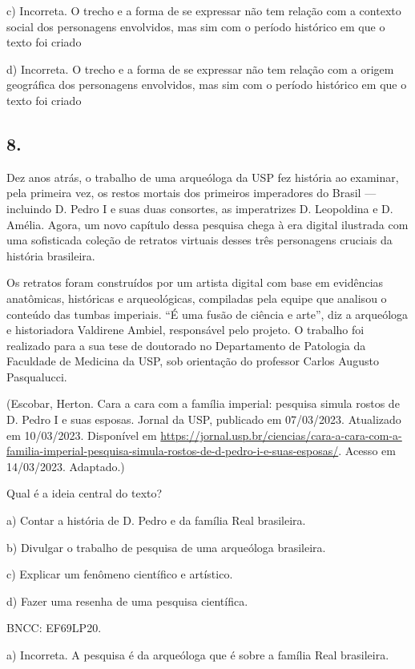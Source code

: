 c) Incorreta. O trecho e a forma de se expressar não tem relação com a
contexto social dos personagens envolvidos, mas sim com o período
histórico em que o texto foi criado

d) Incorreta. O trecho e a forma de se expressar não tem relação com a
origem geográfica dos personagens envolvidos, mas sim com o período
histórico em que o texto foi criado

\hypertarget{section-1}{%
\subsection{8.}\label{section-1}}

Dez anos atrás, o trabalho de uma arqueóloga da USP fez história ao
examinar, pela primeira vez, os restos mortais dos primeiros imperadores
do Brasil --- incluindo D. Pedro I e suas duas consortes, as
imperatrizes D. Leopoldina e D. Amélia. Agora, um novo capítulo dessa
pesquisa chega à era digital ilustrada com uma sofisticada coleção de
retratos virtuais desses três personagens cruciais da história
brasileira.

Os retratos foram construídos por um artista digital com base em
evidências anatômicas, históricas e arqueológicas, compiladas pela
equipe que analisou o conteúdo das tumbas imperiais. ``É uma fusão de
ciência e arte'', diz a arqueóloga e historiadora Valdirene Ambiel,
responsável pelo projeto. O trabalho foi realizado para a sua tese de
doutorado no Departamento de Patologia da Faculdade de Medicina da USP,
sob orientação do professor Carlos Augusto Pasqualucci.

(Escobar, Herton. Cara a cara com a família imperial: pesquisa simula
rostos de D. Pedro I e suas esposas. Jornal da USP, publicado em
07/03/2023. Atualizado em 10/03/2023. Disponível em
\url{https://jornal.usp.br/ciencias/cara-a-cara-com-a-familia-imperial-pesquisa-simula-rostos-de-d-pedro-i-e-suas-esposas/}.
Acesso em 14/03/2023. Adaptado.)

Qual é a ideia central do texto?

a) Contar a história de D. Pedro e da família Real brasileira.

b) Divulgar o trabalho de pesquisa de uma arqueóloga brasileira.

c) Explicar um fenômeno científico e artístico.

d) Fazer uma resenha de uma pesquisa científica.

BNCC: EF69LP20.

a) Incorreta. A pesquisa é da arqueóloga que é sobre a família Real
brasileira.

